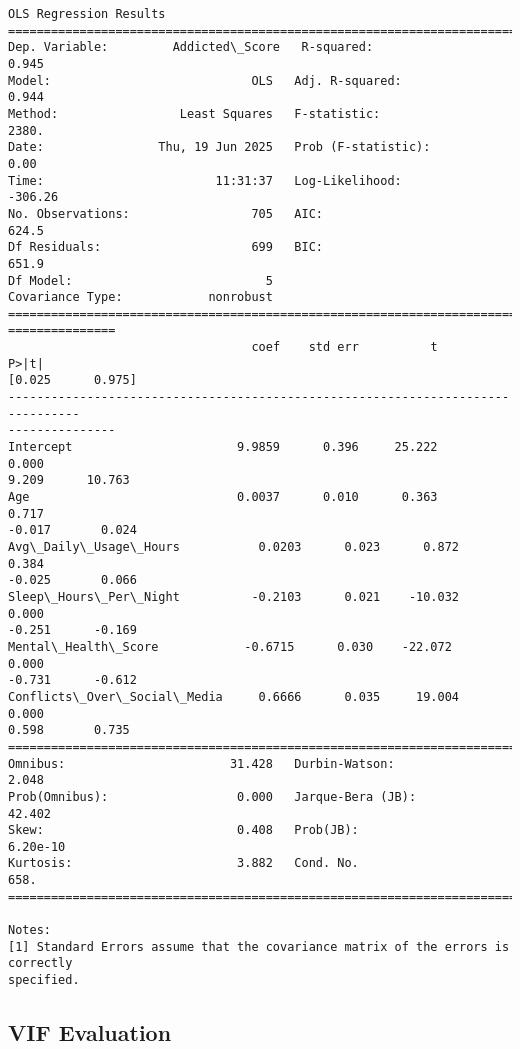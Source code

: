 \documentclass[11pt]{article}
\begin{document}
    \begin{Verbatim}[commandchars=\\\{\}]
                            OLS Regression Results
==============================================================================
Dep. Variable:         Addicted\_Score   R-squared:                       0.945
Model:                            OLS   Adj. R-squared:                  0.944
Method:                 Least Squares   F-statistic:                     2380.
Date:                Thu, 19 Jun 2025   Prob (F-statistic):               0.00
Time:                        11:31:37   Log-Likelihood:                -306.26
No. Observations:                 705   AIC:                             624.5
Df Residuals:                     699   BIC:                             651.9
Df Model:                           5
Covariance Type:            nonrobust
================================================================================
===============
                                  coef    std err          t      P>|t|
[0.025      0.975]
--------------------------------------------------------------------------------
---------------
Intercept                       9.9859      0.396     25.222      0.000
9.209      10.763
Age                             0.0037      0.010      0.363      0.717
-0.017       0.024
Avg\_Daily\_Usage\_Hours           0.0203      0.023      0.872      0.384
-0.025       0.066
Sleep\_Hours\_Per\_Night          -0.2103      0.021    -10.032      0.000
-0.251      -0.169
Mental\_Health\_Score            -0.6715      0.030    -22.072      0.000
-0.731      -0.612
Conflicts\_Over\_Social\_Media     0.6666      0.035     19.004      0.000
0.598       0.735
==============================================================================
Omnibus:                       31.428   Durbin-Watson:                   2.048
Prob(Omnibus):                  0.000   Jarque-Bera (JB):               42.402
Skew:                           0.408   Prob(JB):                     6.20e-10
Kurtosis:                       3.882   Cond. No.                         658.
==============================================================================

Notes:
[1] Standard Errors assume that the covariance matrix of the errors is correctly
specified.
    \end{Verbatim}

    \subsection{VIF Evaluation}\label{vif-evaluation}
\end{document}
